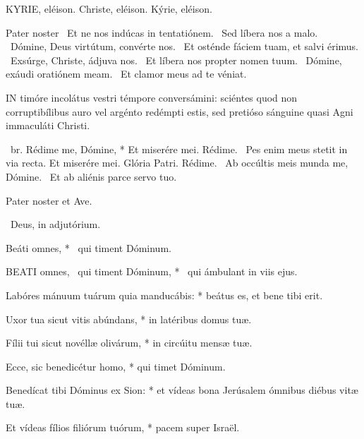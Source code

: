 \label{feria4:precesferialesnona}

KYRIE, eléison. Christe, eléison. Kýrie, eléison.

Pater noster  \V\ Et ne nos indúcas in tentatiónem. \R\ Sed líbera nos a malo. \V\ Dómine, Deus virtútum, convérte nos. \R\ Et osténde fáciem tuam, et salvi érimus. \V\ Exsúrge, Christe, ádjuva nos. \R\ Et líbera nos propter nomen tuum. \V\ Dómine, exáudi oratiónem meam. \R\ Et clamor meus ad te véniat.



\lettrine[lines=2]{I}{N} timóre incolátus vestri témpore conversámini: sciéntes quod non corruptibílibus auro vel argénto redémpti estis, sed pretióso sánguine quasi Agni immaculáti Christi.

\R\ br. Rédime me, Dómine, * Et miserére mei. Rédime. \V\ Pes enim meus stetit in via recta. Et miserére mei. Glória Patri. Rédime. \V\ Ab occúltis meis munda me, Dómine. \R\ Et ab aliénis parce servo tuo.



\sectionornament


Pater noster et Ave.

\V\ Deus, in adjutórium.

 Beáti omnes, * \textdagger\ qui timent Dóminum. \textdaggerdbl


\lettrine[lines=2]{B}{EATI} omnes, \textdagger\ qui timent Dóminum, * \textdaggerdbl\ qui ámbulant in viis ejus.

Labóres mánuum tuárum quia manducábis: * beátus es, et bene tibi erit.

Uxor tua sicut vitis abúndans, * in latéribus domus tuæ.

Fílii tui sicut novéllæ olivárum, * in circúitu mensæ tuæ.

Ecce, sic benedicétur homo, * qui timet Dóminum.

Benedícat tibi Dóminus ex Sion: * et vídeas bona Jerúsalem ómnibus diébus vitæ tuæ.

Et vídeas fílios filiórum tuórum, * pacem super Israël.

